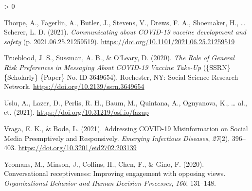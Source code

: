 \documentclass[
  english,
  ,jou,floatsintext]{apa6}
\newlength{\cslhangindent}
\newenvironment{CSLReferences}[2] %
 {%
  \setlength{\parindent}{0pt}
  \ifodd #1 \everypar{\setlength{\hangindent}{\cslhangindent}}\ignorespaces\fi
  \ifnum #2 > 0
  \setlength{\parskip}{#2\baselineskip}
  \fi
 }%
 {}
\begin{document}
\begin{CSLReferences}{1}{0}
\leavevmode\hypertarget{ref-thorpe_communicating_2021}{}%
Thorpe, A., Fagerlin, A., Butler, J., Stevens, V., Drews, F. A., Shoemaker, H., \ldots{} Scherer, L. D. (2021). \emph{Communicating about {COVID}-19 vaccine development and safety} (p. 2021.06.25.21259519). \url{https://doi.org/10.1101/2021.06.25.21259519}

\leavevmode\hypertarget{ref-trueblood_role_2020}{}%
Trueblood, J. S., Sussman, A. B., \& O'Leary, D. (2020). \emph{The {Role} of {General} {Risk} {Preferences} in {Messaging} {About} {COVID}-19 {Vaccine} {Take}-{Up}} (\{SSRN\} \{Scholarly\} \{Paper\} No. ID 3649654). Rochester, NY: Social Science Research Network. \url{https://doi.org/10.2139/ssrn.3649654}

\leavevmode\hypertarget{ref-uslu2021}{}%
Uslu, A., Lazer, D., Perlis, R. H., Baum, M., Quintana, A., Ognyanova, K., \ldots{} al., et. (2021). \url{https://doi.org/10.31219/osf.io/fazup}

\leavevmode\hypertarget{ref-vraga_addressing_2021}{}%
Vraga, E. K., \& Bode, L. (2021). Addressing {COVID}-19 {Misinformation} on {Social} {Media} {Preemptively} and {Responsively}. \emph{Emerging Infectious Diseases}, \emph{27}(2), 396--403. \url{https://doi.org/10.3201/eid2702.203139}

\leavevmode\hypertarget{ref-yeomans2020conversational}{}%
Yeomans, M., Minson, J., Collins, H., Chen, F., \& Gino, F. (2020). Conversational receptiveness: Improving engagement with opposing views. \emph{Organizational Behavior and Human Decision Processes}, \emph{160}, 131--148.

\end{CSLReferences}
\end{document}
